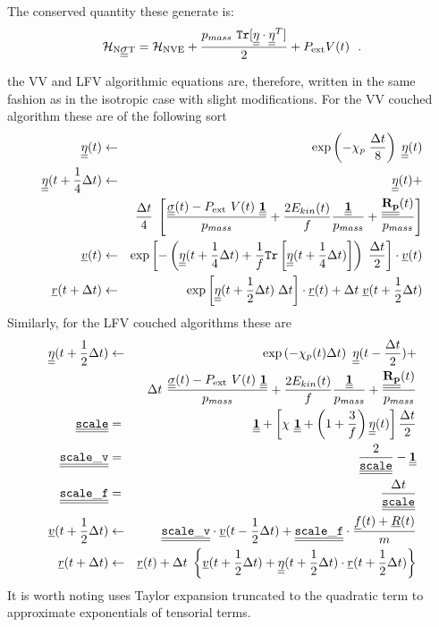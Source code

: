 The conserved quantity these generate is:
\begin{equation}
{\cal H}_{\rm N\mbox{$\underline{\underline{\bf \sigma}}$}T} = {\cal H}_{\rm NVE} + {p_{mass}~{\tt Tr}[\mbox{$\underline{\underline{\bf \eta}}$} \cdot \mbox{$\underline{\underline{\bf \eta}}$}^{T}] \over 2} + P_{\rm ext} V(t)~~.
\end{equation}

the VV and LFV algorithmic equations are, therefore,
written in the same fashion as in the isotropic case with
slight modifications.  For the VV couched algorithm
these are of the following sort
\begin{eqnarray}
\mbox{$\underline{\underline{\bf \eta}}$} (t) &\leftarrow& \exp \left( -\chi_{p} \; {\Delta t \over 8} \right) \;
\mbox{$\underline{\underline{\bf \eta}}$} (t)\nonumber \\
\mbox{$\underline{\underline{\bf \eta}}$}(t + {1 \over 4} \Delta t) &\leftarrow& \mbox{$\underline{\underline{\bf \eta}}$}(t) + \nonumber \\
&& {\Delta t \over 4} \; \left[ \frac{\mbox{$\underline{\underline{\bf \sigma}}$}(t) - P_{\rm ext}~V(t)~\mbox{$\underline{\underline{\bf 1}}$}}{p_{mass}} +
\frac{2 E_{kin}(t)}{f} \frac{\mbox{$\underline{\underline{\bf 1}}$}}{p_{mass}} + \frac{\mbox{$\underline{\underline{\bf R_{p}}}$}(t)}{p_{mass}} \right] \\
\mbox{$\underline{v}$}(t) &\leftarrow& \exp \left[ -\left( \mbox{$\underline{\underline{\bf \eta}}$}(t + {1 \over 4}\Delta t) +
\frac{1}{f} {\tt Tr}\left[\mbox{$\underline{\underline{\bf \eta}}$}(t + {1 \over 4}\Delta t)\right] \right) \;
{\Delta t \over 2} \right] \cdot \mbox{$\underline{v}$}(t) \nonumber \\
\mbox{$\underline{r}$}(t + \Delta t) &\leftarrow& \exp \left[ \mbox{$\underline{\underline{\bf \eta}}$} (t + {1 \over 2} \Delta t) \; \Delta t \right] \cdot
\mbox{$\underline{r}$}(t) + \Delta t \; \mbox{$\underline{v}$}(t + {1 \over 2} \Delta t) \nonumber
\end{eqnarray}
Similarly, for the LFV couched algorithms these are
\begin{eqnarray}
\mbox{$\underline{\underline{\bf \eta}}$}(t + {1 \over 2} \Delta t) &\leftarrow&
\exp \left( -\chi_{p} (t) \Delta t \right) ~ \mbox{$\underline{\underline{\bf \eta}}$}(t - {\Delta t \over 2}) + \nonumber \\
&& \Delta t ~ \frac{\mbox{$\underline{\underline{\bf \sigma}}$}(t) - P_{\rm ext}~V(t)~\mbox{$\underline{\underline{\bf 1}}$}}{p_{mass}} +
\frac{2 E_{kin}(t)}{f} \frac{\mbox{$\underline{\underline{\bf 1}}$}}{p_{mass}} + \frac{\mbox{$\underline{\underline{\bf R_{p}}}$}(t)}{p_{mass}} \nonumber \\
\mbox{$\underline{\underline{\bf \tt scale}}$} &=& \mbox{$\underline{\underline{\bf 1}}$} + \left[ \chi~\mbox{$\underline{\underline{\bf 1}}$} + \left(1+\frac{3}{f}\right) \mbox{$\underline{\underline{\bf \eta}}$} (t) \right] \frac{\Delta t}{2} \nonumber \\
\mbox{$\underline{\underline{\bf \tt scale\_v}}$} &=& \frac{2}{\mbox{$\underline{\underline{\bf \tt scale}}$}} - \mbox{$\underline{\underline{\bf 1}}$} \\
\mbox{$\underline{\underline{\bf \tt scale\_f}}$} &=& \frac{\Delta t}{\mbox{$\underline{\underline{\bf \tt scale}}$}} \nonumber \\
\mbox{$\underline{v}$}(t + {1 \over 2} \Delta t) &\leftarrow&
\mbox{$\underline{\underline{\bf \tt scale\_v}}$} \cdot \mbox{$\underline{v}$}(t - {1 \over 2} \Delta t) +
\mbox{$\underline{\underline{\bf \tt scale\_f}}$} \cdot \frac{\mbox{$\underline{f}$}(t) + \mbox{$\underline{R}$}(t)}{m} \nonumber \\
\mbox{$\underline{r}$}(t + \Delta t) &\leftarrow& \mbox{$\underline{r}$}(t) + \Delta t \;
\left\{ \mbox{$\underline{v}$}(t + {1 \over 2} \Delta t) + \mbox{$\underline{\underline{\bf \eta}}$} (t + {1 \over 2} \Delta t) \cdot
\mbox{$\underline{r}$}(t + {1 \over 2} \Delta t) \right\} \nonumber
\end{eqnarray}
It is worth noting \D uses Taylor expansion truncated to the
quadratic term to approximate exponentials of tensorial terms.

